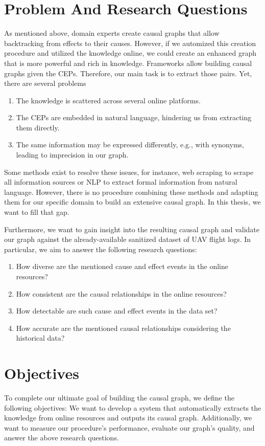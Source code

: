 \section{Problem And Research Questions}\label{sec:problem}
As mentioned above, domain experts create causal graphs that allow backtracking from effects to their causes.
However, if we automized this creation procedure and utilized the knowledge online, we could create an enhanced graph that is more powerful and rich in knowledge.
Frameworks allow building causal graphs given the \ac{CEP}s.
Therefore, our main task is to extract those pairs.
Yet, there are several problems
\begin{enumerate}
    \item The knowledge is scattered across several online platforms.
    \item The \ac{CEP}s are embedded in natural language, hindering us from extracting them directly.
    \item The same information may be expressed differently, e.g., with synonyms, leading to imprecision in our graph.
\end{enumerate}
Some methods exist to resolve these issues, for instance, web scraping to scrape all information sources or \ac{NLP} to extract formal information from natural language.
However, there is no procedure combining these methods and adapting them for our specific domain to build an extensive causal graph.
In this thesis, we want to fill that gap.

Furthermore, we want to gain insight into the resulting causal graph and validate our graph against the already-available sanitized dataset of \ac{UAV} flight logs.
In particular, we aim to answer the following research questions:
\begin{enumerate}
    \item How diverse are the mentioned cause and effect events in the online resources?
    \item How consistent are the causal relationships in the online resources?
    \item How detectable are such cause and effect events in the data set?
    \item How accurate are the mentioned causal relationships considering the historical data?
\end{enumerate}


\section{Objectives}\label{sec:objectives}
To complete our ultimate goal of building the causal graph, we define the following objectives: We want to develop a system that automatically extracts the knowledge from online resources and outputs its causal graph.
Additionally, we want to measure our procedure’s performance, evaluate our graph’s quality, and answer the above research questions.



